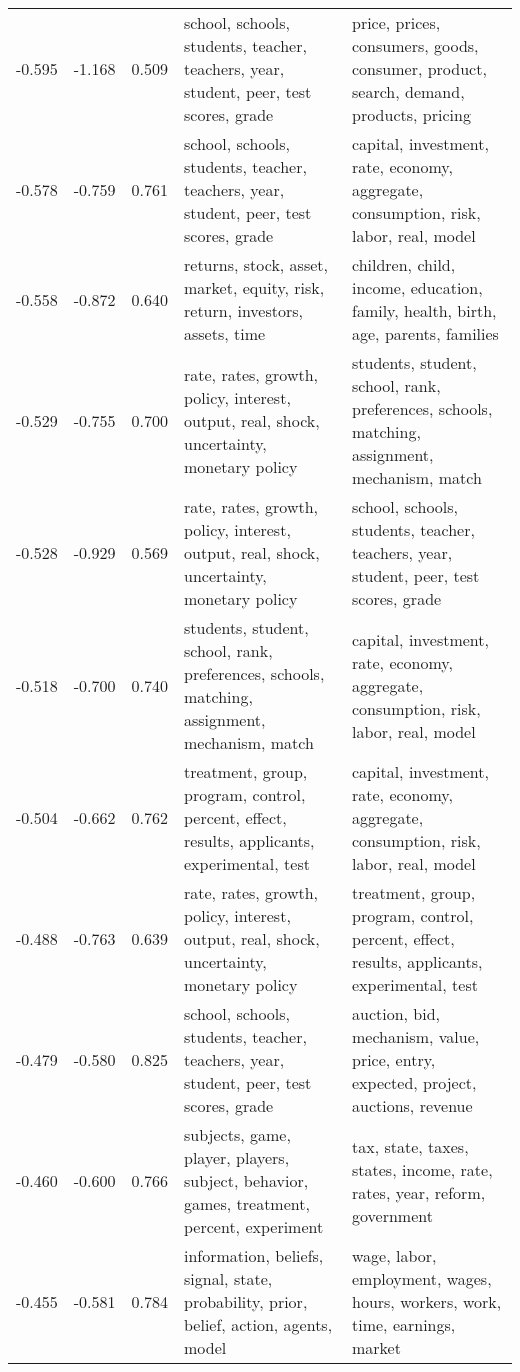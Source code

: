 \begin{tabular}{cccp{5cm}p{5cm}}
-0.595 & -1.168 & 0.509 & school, schools, students, teacher, teachers, year, student, peer, test scores, grade & price, prices, consumers, goods, consumer, product, search, demand, products, pricing \\
-0.578 & -0.759 & 0.761 & school, schools, students, teacher, teachers, year, student, peer, test scores, grade & capital, investment, rate, economy, aggregate, consumption, risk, labor, real, model \\
-0.558 & -0.872 & 0.640 & returns, stock, asset, market, equity, risk, return, investors, assets, time & children, child, income, education, family, health, birth, age, parents, families \\
-0.529 & -0.755 & 0.700 & rate, rates, growth, policy, interest, output, real, shock, uncertainty, monetary policy & students, student, school, rank, preferences, schools, matching, assignment, mechanism, match \\
-0.528 & -0.929 & 0.569 & rate, rates, growth, policy, interest, output, real, shock, uncertainty, monetary policy & school, schools, students, teacher, teachers, year, student, peer, test scores, grade \\
-0.518 & -0.700 & 0.740 & students, student, school, rank, preferences, schools, matching, assignment, mechanism, match & capital, investment, rate, economy, aggregate, consumption, risk, labor, real, model \\
-0.504 & -0.662 & 0.762 & treatment, group, program, control, percent, effect, results, applicants, experimental, test & capital, investment, rate, economy, aggregate, consumption, risk, labor, real, model \\
-0.488 & -0.763 & 0.639 & rate, rates, growth, policy, interest, output, real, shock, uncertainty, monetary policy & treatment, group, program, control, percent, effect, results, applicants, experimental, test \\
-0.479 & -0.580 & 0.825 & school, schools, students, teacher, teachers, year, student, peer, test scores, grade & auction, bid, mechanism, value, price, entry, expected, project, auctions, revenue \\
-0.460 & -0.600 & 0.766 & subjects, game, player, players, subject, behavior, games, treatment, percent, experiment & tax, state, taxes, states, income, rate, rates, year, reform, government \\
-0.455 & -0.581 & 0.784 & information, beliefs, signal, state, probability, prior, belief, action, agents, model & wage, labor, employment, wages, hours, workers, work, time, earnings, market \\

\end{tabular}

